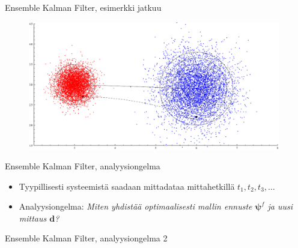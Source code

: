 \documentclass{beamer}
\begin{document}
\begin{frame}{Ensemble Kalman Filter, esimerkki jatkuu}

\begin{figure}
\includegraphics[width=11cm]{enkf4.pdf}
\end{figure}

\end{frame}

\begin{frame}{Ensemble Kalman Filter, analyysiongelma}

\begin{itemize}
\item Tyypillisesti systeemistä saadaan mittadataa mittahetkillä $t_1, t_2, t_3, \dots$
\item Analyysiongelma: \emph{Miten yhdistää optimaalisesti mallin ennuste $\boldsymbol{\psi}^f$ ja uusi mittaus $\boldsymbol{d}$?}
\end{itemize}

\end{frame}

\begin{frame}{Ensemble Kalman Filter, analyysiongelma 2}

\begin{figure}
\end{figure}

\end{frame}
\end{document}
